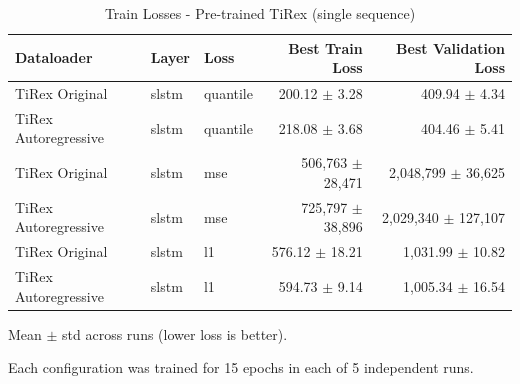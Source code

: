 \documentclass[a4paper,oneside,10pt,ngerman,english]{scrartcl}
\begin{document}
\begin{table}[htbp]
	\centering
	\begin{threeparttable}
		\caption{Train Losses - Pre-trained TiRex (single sequence)}
		\label{tab:losses_tirex_single}
		\setlength{\tabcolsep}{3pt}
		\begin{tabular}{lllrr}
			\toprule
			\textbf{Dataloader} & \textbf{Layer} & \textbf{Loss} &
			\textbf{Best Train Loss} & \textbf{Best Validation Loss}\\
			\midrule
			
			TiRex Original & slstm & quantile &
			\cellcolor[HTML]{006837}\color[HTML]{f1f1f1}200.12 $\pm$ 3.28 &
			409.94 $\pm$ 4.34 \\
			
			TiRex Autoregressive & slstm & quantile &
			218.08 $\pm$ 3.68 & 
			\cellcolor[HTML]{006837}\color[HTML]{f1f1f1}404.46 $\pm$ 5.41	 \\
			
			\midrule
			
			TiRex Original & slstm & mse &
			\cellcolor[HTML]{006837}\color[HTML]{f1f1f1}506,763 $\pm$ 28,471 &
			2,048,799 $\pm$ 36,625 \\
			
			TiRex Autoregressive & slstm & mse &
			725,797 $\pm$ 38,896 & 
			\cellcolor[HTML]{006837}\color[HTML]{f1f1f1}2,029,340 $\pm$ 127,107 \\
			
			\midrule
			
			TiRex Original & slstm & l1 &
			\cellcolor[HTML]{006837}\color[HTML]{f1f1f1}576.12 $\pm$ 18.21 &
			1,031.99 $\pm$ 10.82	 \\
			
			TiRex Autoregressive & slstm & l1 &
			594.73 $\pm$ 9.14 & 
			\cellcolor[HTML]{006837}\color[HTML]{f1f1f1}1,005.34 $\pm$ 16.54 \\
			
			\bottomrule
		\end{tabular}
		
		\begin{tablenotes}
			\small
			\item[a] Mean $\pm$ std across runs (lower loss is better).
			\item[b] Each configuration was trained for 15 epochs in each of 5 independent runs.
		\end{tablenotes}
	\end{threeparttable}
\end{table}
\end{document}
